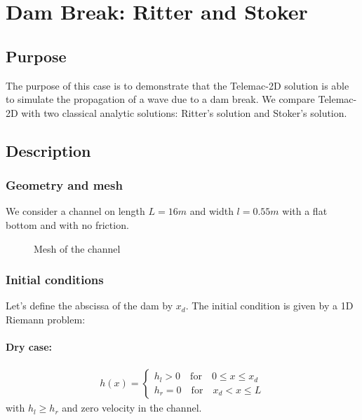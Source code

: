\chapter{Dam Break: Ritter and Stoker}
%
%
\section{Purpose}
%
The purpose of this case is to demonstrate that the Telemac-2D solution is able to simulate the propagation of a wave due to a dam break. We compare Telemac-2D with two classical analytic solutions: Ritter's solution and Stoker's solution.

%
\section{Description}
%
\subsection{Geometry and mesh}

We consider a channel on length $L=16m$ and width $l=0.55m$ with a flat bottom and with no friction.

\begin{figure}[H]
   \centering
 \caption{Mesh of the channel} \label{fig:rittermesh}
 \end{figure}

\subsection{Initial conditions}

Let's define the abscissa of the dam by $x_d$. The initial condition is given by a 1D Riemann problem:

\subsubsection{Dry case:}

\begin{equation}
\begin{split}h(x) = \begin{cases}
h_l > 0 \quad \text{for} \quad 0 \leq x \leq x_d \\
h_r = 0 \quad \text{for} \quad x_d < x \leq L
\end{cases}\end{split}
\end{equation}
with $h_l \geq h_r$ and zero velocity in the channel.

